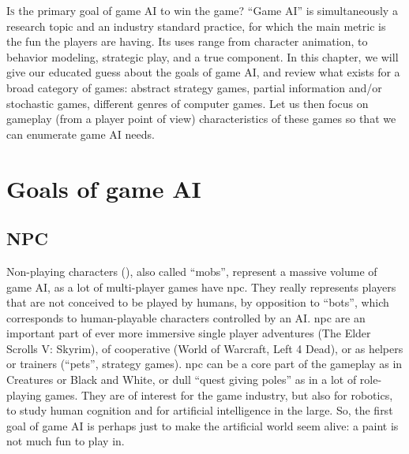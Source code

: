 \lettrine{I}{s} the primary goal of game AI to win the game? ``Game AI'' is simultaneously a research topic and an industry standard practice, for which the main metric is the fun the players are having. Its uses range from character animation, to behavior modeling, strategic play, and a true  component. In this chapter, we will give our educated guess about the goals of game AI, and review what exists for a broad category of games: abstract strategy games, partial information and/or stochastic games, different genres of computer games. Let us then focus on gameplay (from a player point of view) characteristics of these games so that we can enumerate game AI needs. %



\section{Goals of game AI}
\subsection{NPC}
Non-playing characters (), also called ``mobs'', represent a massive volume of game AI, as a lot of multi-player games have \gls{npc}. They really represents players that are not conceived to be played by humans, by opposition to ``bots'', which corresponds to human-playable characters controlled by an AI. \gls{npc} are an important part of ever more immersive single player adventures (The Elder Scrolls V: Skyrim), of cooperative  (World of Warcraft, Left 4 Dead), or as helpers or trainers (``pets'', strategy games). \gls{npc} can be a core part of the gameplay as in Creatures or Black and White, or dull ``quest giving poles'' as in a lot of role-playing games. They are of interest for the game industry, but also for robotics, to study human cognition and for artificial intelligence in the large. So, the first goal of game AI is perhaps just to make the artificial world seem alive: a paint is not much fun to play in.

